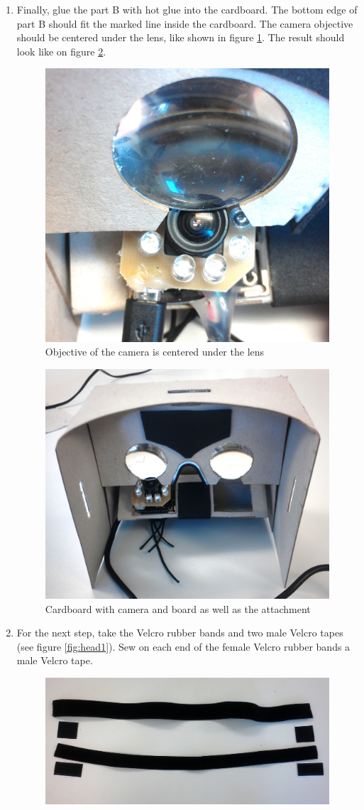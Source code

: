 \documentclass[../../Cardboard_Assembling]{subfiles}
\begin{document}
\begin{enumerate}
	\clearpage
	\item Finally, glue the part B with hot glue into the cardboard. The bottom edge of part B should fit the marked line inside the cardboard. The camera objective should be centered under the lens, like shown in figure \ref{fig:objective}. The result should look like on figure \ref{fig:screenshot024}.
	\begin{figure}[h!tb]
		\centering
		\includegraphics[width=0.45\linewidth]{positionObj}
		\caption{Objective of the camera is centered under the lens}
		\label{fig:objective}
	\end{figure}
	\begin{figure}[h!tb]
		\centering
		\includegraphics[width=0.65\linewidth]{holder13}
		\caption{Cardboard with camera and board as well as the attachment}
		\label{fig:screenshot024}
	\end{figure}
	\clearpage
	\item For the next step, take the Velcro rubber bands and two male Velcro tapes (see figure \ref{fig:head1}). Sew on each end of the female Velcro rubber bands a male Velcro tape.
	\begin{figure}[h!tb]
		\centering
		\includegraphics[width=0.63\linewidth]{head01}

\end{figure}
\end{enumerate}
\end{document}
